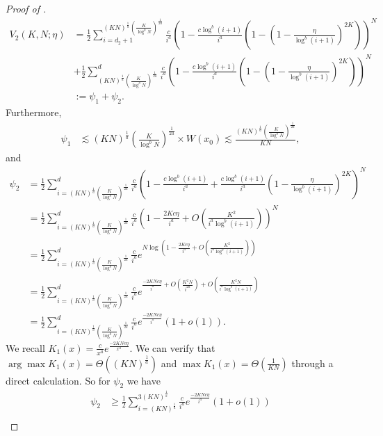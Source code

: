 \begin{proof}[Proof of ]
\begin{align*}
    V_2(K,N;\eta)
    &=\frac{1}{2}\sum_{i=d_2 + 1}^{(KN)^{\frac{1}{a}}\left(\frac{K}{\log^bN}\right)^{\frac{1}{2a}}}\frac{c}{i^{a}}\left(1-\frac{c\log^b (i+1)}{i^{a}}\left(1-\left(1-\frac{\eta}{\log^b (i+1)}\right)^{2K}\right)\right)^N \\
    &+\frac{1}{2}\sum_{(KN)^{\frac{1}{a}}\left(\frac{K}{\log^bN}\right)^{\frac{1}{2a}}}^{d}\frac{c}{i^{a}}\left(1-\frac{c\log^b (i+1)}{i^{a}}\left(1-\left(1-\frac{\eta}{\log^b (i+1)}\right)^{2K}\right)\right)^N \\
    &:=\psi_1+\psi_2.
\end{align*}
Furthermore, 
\begin{align*}
    \psi_1&\lesssim (KN)^{\frac{1}{a}}\left(\frac{K}{\log^bN}\right)^{\frac{1}{2a}}\times W(x_0)\lesssim\frac{(KN)^{\frac{1}{a}}\left(\frac{K}{\log^bN}\right)^{\frac{1}{2a}}}{KN},
\end{align*}
and 
\begin{align*}
    \psi_2&=\frac{1}{2}\sum_{i=(KN)^{\frac{1}{a}}\left(\frac{K}{\log^bN}\right)^{\frac{1}{2a}}}^{d}\frac{c}{i^{a}}\left(1-\frac{c\log^b(i+1)}{i^{a}}+\frac{c\log^b (i+1)}{i^{a}}\left(1-\frac{\eta}{\log^b (i+1) }\right)^{2K}\right)^N \\
    &=\frac{1}{2}\sum_{i=(KN)^{\frac{1}{a}}\left(\frac{K}{\log^bN}\right)^{\frac{1}{2a}}}^{d}\frac{c}{i^{a}}\left(1-\frac{2Kc\eta}{i^{a}}+O\left(\frac{K^2}{i^{a}\log^b (i+1)}\right)\right)^N \\
    &=\frac{1}{2}\sum_{i=(KN)^{\frac{1}{a}}\left(\frac{K}{\log^bN}\right)^{\frac{1}{2a}}}^{d}\frac{c}{i^{a}}e^{N\log \left(1-\frac{2Kc\eta}{i^{a}}+O\left(\frac{K^2}{i^{a}\log^b (i+1)}\right)\right)} \\
    &=\frac{1}{2}\sum_{i=(KN)^{\frac{1}{a}}\left(\frac{K}{\log^bN}\right)^{\frac{1}{2a}}}^{d}\frac{c}{i^{a}}e^{\frac{-2KNc\eta}{i^{a}}+O\left(\frac{K^2N}{i^{2a}}\right)+O\left(\frac{K^2N}{i^{a}\log^b (i+1)}\right)} \\
    &=\frac{1}{2}\sum_{i=(KN)^{\frac{1}{a}}\left(\frac{K}{\log^bN}\right)^{\frac{1}{2a}}}^{d}\frac{c}{i^{a}}e^{\frac{-2KNc\eta}{i^{a}}}(1+o(1)). 
\end{align*}
We recall $K_1(x) = \frac{c}{x^{a}}e^{\frac{-2KNc\eta}{x^{a}}}$.
We can verify that $\arg\max K_1(x) = \Theta\left((KN)^{\frac{1}{a}}\right)$ and $\max K_1(x) = \Theta\left(\frac{1}{KN}\right)$ through a direct calculation.
So for $\psi_2$ we have
\begin{align*}
    \psi_2&\geq \frac{1}{2}\sum_{i=(KN)^{\frac{1}{a}}}^{3(KN)^{\frac{1}{a}}}\frac{c}{i^{a}}e^{\frac{-2KNc\eta}{i^{a}}}(1+o(1)) \\

\end{align*}
\end{proof}
